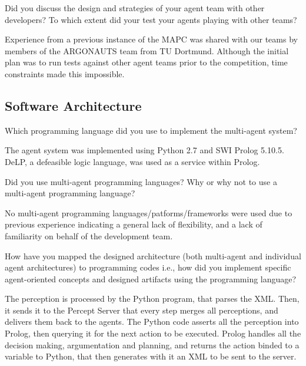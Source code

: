 \begin{question}
Did you discuss the design and strategies of your agent team with other
developers? To which extent did your test your agents playing with other
teams?  
\end{question}

Experience from a previous instance of the MAPC was shared with our
teams by members of the ARGONAUTS team from TU Dortmund. Although the
initial plan was to run tests against other agent teams prior to the
competition, time constraints made this impossible.

\subsection{Software Architecture}
\setcounter{question}{0}
\begin{question}
Which programming language did you use to
implement the multi-agent system?  
\end{question}

The agent system was implemented using
Python 2.7 and SWI Prolog 5.10.5. DeLP, a defeasible logic language, was used
as a service within Prolog.

\begin{question}
Did you use multi-agent programming languages? Why or why not to use a
multi-agent programming language?  
\end{question}

No multi-agent programming
languages/patforms/frameworks were used due to previous experience indicating
a general lack of flexibility, and a lack of familiarity on behalf of the
development team.

\begin{question}
How have you mapped the designed architecture (both multi-agent and
individual agent architectures) to programming codes i.e., how did you
implement specific agent-oriented concepts and designed artifacts using the
programming language?  
\end{question}

The perception is processed by the Python program, that
parses the XML. Then, it sends it to the Percept Server that every step merges
all perceptions, and delivers them back to the agents.  The Python code
asserts all the perception into Prolog, then querying it for the next action
to be executed.  Prolog handles all the decision making, argumentation and
planning, and returns the action binded to a variable to Python, that then
generates with it an XML to be sent to the server.

